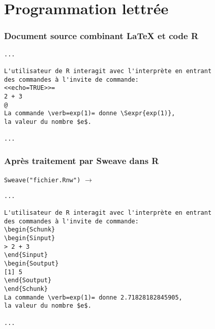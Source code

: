 
\section{Programmation lettrée}

\begin{frame}[fragile=singleslide]
  \frametitle{Document source combinant {\LaTeX} et code R}

\begin{lstlisting}[emph={Sexpr}]
...

L'utilisateur de R interagit avec l'interprète en entrant
des commandes à l'invite de commande:
<<echo=TRUE>>=
2 + 3
@
La commande \verb=exp(1)= donne \Sexpr{exp(1)},
la valeur du nombre $e$.

...
\end{lstlisting}
\end{frame}

\begin{frame}[fragile=singleslide]
  \frametitle{Après traitement par Sweave dans R}

  \texttt{Sweave("fichier.Rnw")}
  $\rightarrow$ 
\begin{lstlisting}[emph={Schunk,Sinput,Soutput}]
...

L'utilisateur de R interagit avec l'interprète en entrant
des commandes à l'invite de commande:
\begin{Schunk}
\begin{Sinput}
> 2 + 3
\end{Sinput}
\begin{Soutput}
[1] 5
\end{Soutput}
\end{Schunk}
La commande \verb=exp(1)= donne 2.71828182845905,
la valeur du nombre $e$.

...
\end{lstlisting}

\end{frame}

